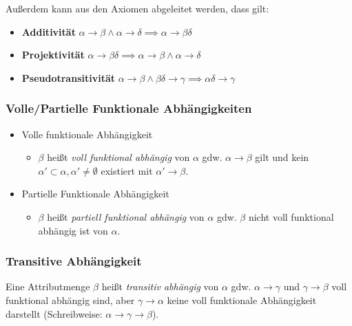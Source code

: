 				Außerdem kann aus den Axiomen abgeleitet werden, dass gilt:
				\begin{itemize}
					\item \textbf{Additivität} \( \alpha \rightarrow \beta \land \alpha \rightarrow \delta \implies \alpha \rightarrow \beta\delta \)
					\item \textbf{Projektivität} \( \alpha \rightarrow \beta\delta \implies \alpha \rightarrow \beta \land \alpha \rightarrow \delta \)
					\item \textbf{Pseudotransitivität} \( \alpha \rightarrow \beta \land \beta\delta \rightarrow \gamma \implies \alpha\delta \rightarrow \gamma \)
				\end{itemize}

			\subsubsection{Volle/Partielle Funktionale Abhängigkeiten} %
				\begin{itemize}
					\item Volle funktionale Abhängigkeit
						\begin{itemize}
							\item \(\beta\) heißt \textit{voll funktional abhängig} von \(\alpha\) gdw. \(\alpha \rightarrow \beta\) gilt und kein \( \alpha' \subset \alpha, \alpha' \neq \emptyset \) existiert mit \( \alpha' \rightarrow \beta \).
						\end{itemize}
					\item Partielle Funktionale Abhängigkeit
						\begin{itemize}
							\item \( \beta \) heißt \textit{partiell funktional abhängig} von \(\alpha\) gdw. \(\beta\) nicht voll funktional abhängig ist von \(\alpha\).
						\end{itemize}
				\end{itemize}

			\subsubsection{Transitive Abhängigkeit} %
				Eine Attributmenge \(\beta\) heißt \textit{transitiv abhängig} von \(\alpha\) gdw. \(\alpha \rightarrow \gamma\) und \(\gamma \rightarrow \beta\) voll funktional abhängig sind, aber \(\gamma \rightarrow \alpha\) keine voll funktionale Abhängigkeit darstellt (Schreibweise: \( \alpha \rightarrow \gamma \rightarrow \beta \)).

